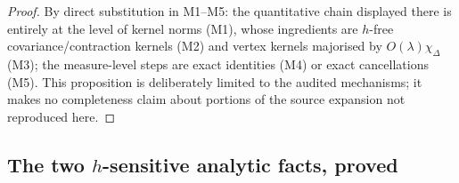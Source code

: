 \documentclass[11pt,a4paper]{article}
\theoremstyle{plain}
\theoremstyle{definition}
\theoremstyle{plain}
\theoremstyle{definition}
\begin{document}
\begin{proof}
By direct substitution in M1--M5: the quantitative chain displayed there is entirely at the level of kernel norms (M1), whose
ingredients are $h$-free covariance/contraction kernels (M2) and vertex kernels majorised
by $O(\lambda)\chi_\Delta$ (M3); the measure-level steps are exact identities (M4) or
exact cancellations (M5).  This proposition is deliberately limited to the audited
mechanisms; it makes no completeness claim about portions of the source expansion not
reproduced here.
\end{proof}

\subsection*{The two $h$-sensitive analytic facts, proved}
\end{document}
